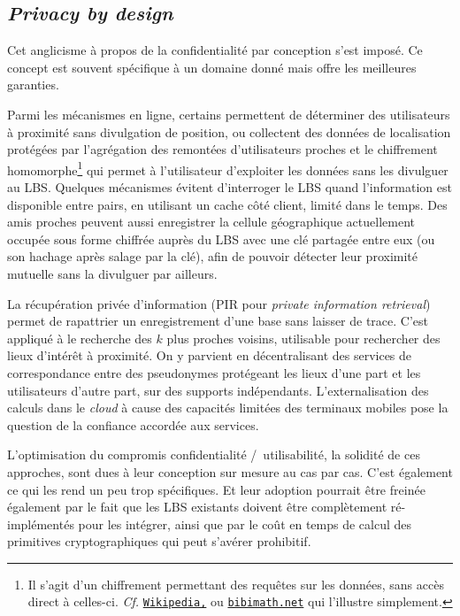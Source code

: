 \documentclass[a4paper,11pt]{article} %
\newcommand{\www}[2]{\href{#1}{\nolinkurl{#2}}}
\begin{document}
\subsection{\emph{Privacy by design}}
%
Cet anglicisme à propos de la confidentialité par conception s'est imposé. Ce concept est souvent spécifique à un domaine donné mais offre les meilleures garanties. 

Parmi les mécanismes en ligne, certains permettent de déterminer des utilisateurs à proximité sans divulgation de position, ou collectent des données de localisation protégées par l'agrégation des remontées d'utilisateurs proches et le chiffrement homomorphe\footnote{Il s'agit d'un chiffrement permettant des requêtes sur les données, sans accès direct à celles-ci. \emph{Cf.} 
\www{https://fr.wikipedia.org/wiki/Chiffrement_homomorphe}{Wikipedia,} ou   \www{http://www.bibmath.net/crypto/index.php?action=affiche&quoi=moderne/homomorphe}{bibimath.net} qui l'illustre simplement.} 
    qui permet à l'utilisateur d'exploiter les données sans les divulguer au LBS.
Quelques mécanismes évitent d'interroger le LBS quand l'information est disponible entre pairs, en utilisant un cache côté client, limité dans le temps. 
Des amis proches peuvent aussi  enregistrer la cellule géographique actuellement occupée sous forme chiffrée auprès du LBS avec une clé partagée entre eux (ou son hachage après \og salage\fg{} par la clé), afin de pouvoir détecter leur proximité mutuelle sans la divulguer par ailleurs.

La récupération privée d'information (PIR pour \emph{private information retrieval}) permet de rapattrier un enregistrement d'une base sans laisser de trace. 
C'est appliqué à le recherche des $k$ plus proches voisins, utilisable pour rechercher des lieux d'intérêt à proximité.
On y parvient en décentralisant des services de correspondance entre des pseudonymes protégeant les lieux d'une part et les utilisateurs d'autre part, sur des supports indépendants. L'externalisation des calculs dans le \emph{cloud} à cause des capacités limitées des terminaux mobiles pose la question de la confiance accordée aux services.

L'optimisation du compromis confidentialité /~utilisabilité, la solidité de ces approches, sont dues à leur conception \og sur mesure\fg{} au cas par cas. C'est également ce qui les rend un peu trop spécifiques. Et leur adoption pourrait être freinée également par le fait que les LBS existants doivent être complètement ré-implémentés pour les intégrer, ainsi que par le coût en temps de calcul des primitives cryptographiques qui peut s'avérer prohibitif. 
%
\end{document}
